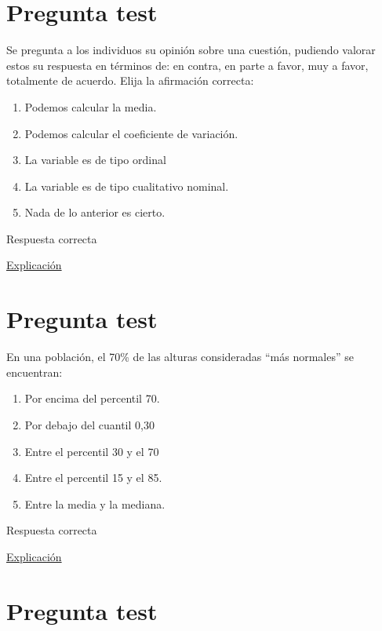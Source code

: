 \documentclass[
]{book}
\providecommand{\tightlist}{%
  \setlength{\itemsep}{0pt}\setlength{\parskip}{0pt}}
\begin{document}
\hypertarget{pregunta-test-74}{%
\section{Pregunta test}\label{pregunta-test-74}}

Se pregunta a los individuos su opinión sobre una cuestión, pudiendo valorar estos su respuesta en términos de: en contra, en parte a favor, muy a favor, totalmente de acuerdo. Elija la afirmación correcta:

\begin{enumerate}
\def\labelenumi{\alph{enumi})}
\tightlist
\item
  Podemos calcular la media.
\item
  Podemos calcular el coeficiente de variación.
\item
  La variable es de tipo ordinal
\item
  La variable es de tipo cualitativo nominal.
\item
  Nada de lo anterior es cierto.
\end{enumerate}

Respuesta correcta

\href{https://1fjmanzano.github.io/bioestadistica/tipos-de-variables.html}{Explicación}

\hypertarget{pregunta-test-75}{%
\section{Pregunta test}\label{pregunta-test-75}}

En una población, el 70\% de las alturas consideradas ``más normales'' se encuentran:

\begin{enumerate}
\def\labelenumi{\alph{enumi})}
\tightlist
\item
  Por encima del percentil 70.
\item
  Por debajo del cuantil 0,30
\item
  Entre el percentil 30 y el 70
\item
  Entre el percentil 15 y el 85.
\item
  Entre la media y la mediana.
\end{enumerate}

Respuesta correcta

\href{https://1fjmanzano.github.io/bioestadistica/distribuciones-de-probabilidad.html\#distribucio\%CC\%81n-normal}{Explicación}

\hypertarget{pregunta-test-76}{%
\section{Pregunta test}\label{pregunta-test-76}}
\end{document}
